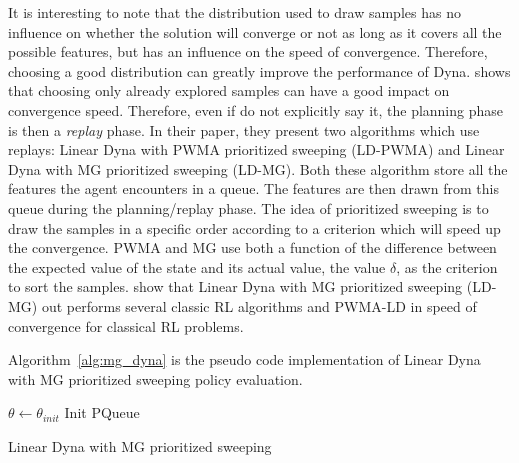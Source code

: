 \documentclass[]{article}
\begin{document}
It is interesting to note that the distribution used to draw samples has no influence on whether the solution will converge or not as long as it covers all the possible features, but has an influence on the speed of convergence. Therefore, choosing a good distribution can greatly improve the performance of Dyna. \textcite{sutton_dyna-style_2012} shows that choosing only already explored samples can have a good impact on convergence speed. Therefore, even if \textcite{sutton_dyna-style_2012} do not explicitly say it, the planning phase is then a \emph{replay} phase. In their paper, they present two algorithms which use replays: Linear  Dyna  with  PWMA  prioritized sweeping (LD-PWMA) and Linear Dyna with MG prioritized sweeping (LD-MG). Both these algorithm store all the features the agent encounters in a queue. The features are then drawn from this queue during the planning/replay phase. The idea of prioritized sweeping is to draw the samples in a specific order according to a criterion which will speed up the convergence. PWMA and MG use both a function of the difference between the expected value of the state and its actual value, the value \(\delta\), as the criterion to sort the samples. \textcite{sutton_dyna-style_2012} show that Linear Dyna with MG prioritized sweeping (LD-MG) out performs several classic RL algorithms and PWMA-LD in speed of convergence for classical RL problems.

Algorithm~\ref{alg:mg_dyna} is the pseudo code implementation of Linear Dyna with MG prioritized sweeping policy evaluation.

\begin{algorithm}[htbp]
  \DontPrintSemicolon
  \SetAlgoNoLine
  \(\theta \gets \theta_{init}\)\;
  Init PQueue\;
  \caption{Linear Dyna with MG prioritized sweeping \label{alg:mg_dyna}}

\end{algorithm}
\end{document}
